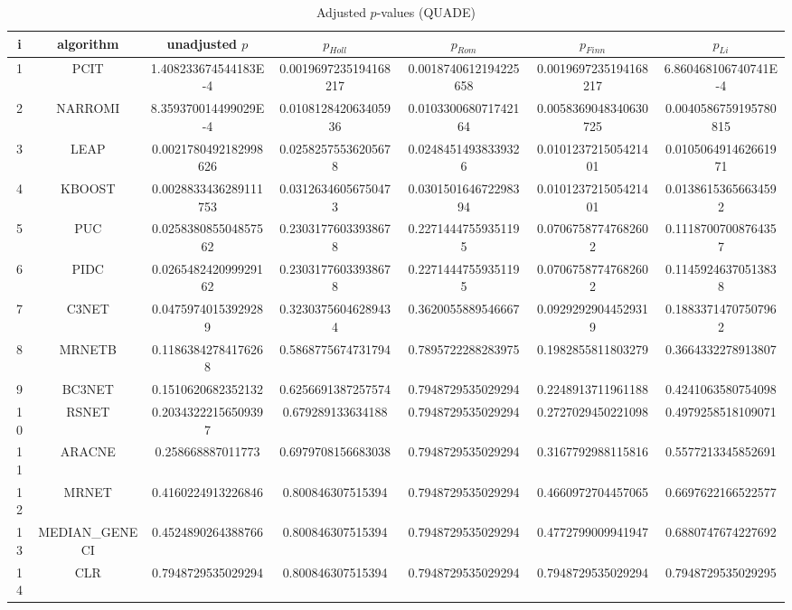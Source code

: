 \documentclass[a4paper,10pt]{article}
\begin{document}
\begin{landscape}
\begin{table}[!htp]
\centering\scriptsize
\caption{Adjusted $p$-values (QUADE)}
\begin{tabular}{ccccccc}
i&algorithm&unadjusted $p$&$p_{Holl}$&$p_{Rom}$&$p_{Finn}$&$p_{Li}$\\
\hline
1&PCIT&1.408233674544183E-4&0.0019697235194168217&0.0018740612194225658&0.0019697235194168217&6.860468106740741E-4\\
2&NARROMI&8.359370014499029E-4&0.010812842063405936&0.010330068071742164&0.0058369048340630725&0.0040586759195780815\\
3&LEAP&0.0021780492182998626&0.02582575536205678&0.02484514938339326&0.010123721505421401&0.010506491462661971\\
4&KBOOST&0.0028833436289111753&0.03126346056750473&0.030150164672298394&0.010123721505421401&0.01386153656634592\\
5&PUC&0.025838085504857562&0.23031776033938678&0.22714447559351195&0.07067587747682602&0.11187007008764357\\
6&PIDC&0.026548242099929162&0.23031776033938678&0.22714447559351195&0.07067587747682602&0.11459246370513838\\
7&C3NET&0.04759740153929289&0.32303756046289434&0.3620055889546667&0.09292929044529319&0.18833714707507962\\
8&MRNETB&0.11863842784176268&0.5868775674731794&0.7895722288283975&0.1982855811803279&0.3664332278913807\\
9&BC3NET&0.1510620682352132&0.6256691387257574&0.7948729535029294&0.2248913711961188&0.4241063580754098\\
10&RSNET&0.20343222156509397&0.679289133634188&0.7948729535029294&0.2727029450221098&0.4979258518109071\\
11&ARACNE&0.258668887011773&0.6979708156683038&0.7948729535029294&0.3167792988115816&0.5577213345852691\\
12&MRNET&0.4160224913226846&0.800846307515394&0.7948729535029294&0.4660972704457065&0.6697622166522577\\
13&MEDIAN_GENECI&0.4524890264388766&0.800846307515394&0.7948729535029294&0.4772799009941947&0.6880747674227692\\
14&CLR&0.7948729535029294&0.800846307515394&0.7948729535029294&0.7948729535029294&0.7948729535029295\\
\hline
\end{tabular}
\end{table}

\end{landscape}
\end{document}
